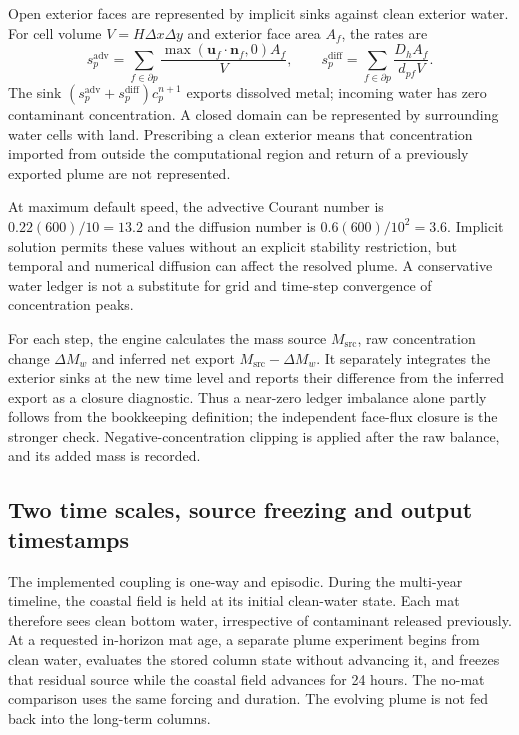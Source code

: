 Open exterior faces are represented by implicit sinks against clean exterior water. For cell volume $V=H\Delta x\Delta y$ and exterior face area $A_f$, the rates are
\begin{equation}
 s_p^{\mathrm{adv}}=\sum_{f\in\partial p}\frac{\max(\boldsymbol{u}_f\!\cdot\boldsymbol{n}_f,0)A_f}{V},\qquad
 s_p^{\mathrm{diff}}=\sum_{f\in\partial p}\frac{D_hA_f}{d_{pf}V}.
 \label{eq:exterior_sinks}
\end{equation}
The sink $(s_p^{\mathrm{adv}}+s_p^{\mathrm{diff}})c_p^{n+1}$ exports dissolved metal; incoming water has zero contaminant concentration. A closed domain can be represented by surrounding water cells with land. Prescribing a clean exterior means that concentration imported from outside the computational region and return of a previously exported plume are not represented.

At maximum default speed, the advective Courant number is $0.22(600)/10=13.2$ and the diffusion number is $0.6(600)/10^2=3.6$. Implicit solution permits these values without an explicit stability restriction, but temporal and numerical diffusion can affect the resolved plume. A conservative water ledger is not a substitute for grid and time-step convergence of concentration peaks.

For each step, the engine calculates the mass source $M_{\mathrm{src}}$, raw concentration change $\Delta M_w$ and inferred net export $M_{\mathrm{src}}-\Delta M_w$. It separately integrates the exterior sinks at the new time level and reports their difference from the inferred export as a closure diagnostic. Thus a near-zero ledger imbalance alone partly follows from the bookkeeping definition; the independent face-flux closure is the stronger check. Negative-concentration clipping is applied after the raw balance, and its added mass is recorded.

\subsection{Two time scales, source freezing and output timestamps}
\label{sec:time_coupling}

The implemented coupling is one-way and episodic. During the multi-year timeline, the coastal field is held at its initial clean-water state. Each mat therefore sees clean bottom water, irrespective of contaminant released previously. At a requested in-horizon mat age, a separate plume experiment begins from clean water, evaluates the stored column state without advancing it, and freezes that residual source while the coastal field advances for 24 hours. The no-mat comparison uses the same forcing and duration. The evolving plume is not fed back into the long-term columns.\cite{repository}

